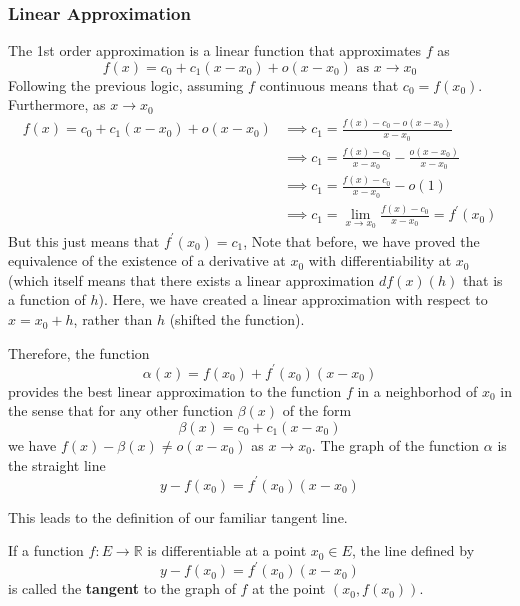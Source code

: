     \subsubsection{Linear Approximation}
    The 1st order approximation is a linear function that approximates $f$ as
    \[f(x) = c_0 + c_1(x - x_0) + o(x - x_0) \text{ as } x \rightarrow x_0\]
    Following the previous logic, assuming $f$ continuous means that $c_0 = f(x_0)$. Furthermore, as $x \rightarrow x_0$
    \begin{align*}
        f(x) = c_0 + c_1(x - x_0) + o(x - x_0) & \implies c_1 = \frac{f(x) - c_0 - o(x - x_0)}{x - x_0} \\
        & \implies c_1 = \frac{f(x) - c_0}{x - x_0} - \frac{o(x - x_0)}{x - x_0}\\
        & \implies c_1 = \frac{f(x) - c_0}{x - x_0} - o(1) \\
        & \implies c_1 = \lim_{x \rightarrow x_0} \frac{f(x) - c_0}{x - x_0} = f^\prime (x_0)
    \end{align*}
    But this just means that $f^\prime (x_0) = c_1$, Note that before, we have proved the equivalence of the existence of a derivative at $x_0$ with differentiability at $x_0$ (which itself means that there exists a linear approximation $df(x)(h)$ that is a function of $h$). Here, we have created a linear approximation with respect to $x = x_0 + h$, rather than $h$ (shifted the function). 

    Therefore, the function 
    \[\alpha (x) = f(x_0) + f^\prime (x_0) (x - x_0)\]
    provides the best linear approximation to the function $f$ in a neighborhod of $x_0$ in the sense that for any other function $\beta(x)$ of the form 
    \[\beta(x) = c_0 + c_1 (x - x_0)\]
    we have $f(x) - \beta(x) \neq o(x - x_0)$ as $x \rightarrow x_0$. The graph of the function $\alpha$ is the straight line
    \[y - f(x_0) = f^\prime (x_0) (x - x_0)\]

    This leads to the definition of our familiar tangent line. 

    \begin{definition}
      If a function $f: E \longrightarrow \mathbb{R}$ is differentiable at a point $x_0 \in E$, the line defined by
      \[y - f(x_0) = f^\prime (x_0) (x - x_0)\]
      is called the \textbf{tangent} to the graph of $f$ at the point $(x_0, f(x_0))$. 
    \end{definition}

